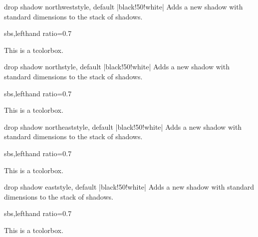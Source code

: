 \begin{docTcbKey}{drop shadow northwest}{}{style, default |black!50!white|}
  Adds a new shadow with standard dimensions to the stack of shadows.
\begin{dispExample*}{sbs,lefthand ratio=0.7}
\begin{tcolorbox}[drop shadow northwest,
  enhanced,colback=red!5!white,colframe=red!75!black]
  This is a tcolorbox.
\end{tcolorbox}
\end{dispExample*}
\end{docTcbKey}%

\begin{docTcbKey}{drop shadow north}{}{style, default |black!50!white|}
  Adds a new shadow with standard dimensions to the stack of shadows.
\begin{dispExample*}{sbs,lefthand ratio=0.7}
\begin{tcolorbox}[drop shadow north,
  enhanced,colback=red!5!white,colframe=red!75!black]
  This is a tcolorbox.
\end{tcolorbox}
\end{dispExample*}
\end{docTcbKey}%

\clearpage
\begin{docTcbKey}{drop shadow northeast}{}{style, default |black!50!white|}
  Adds a new shadow with standard dimensions to the stack of shadows.
\begin{dispExample*}{sbs,lefthand ratio=0.7}
\begin{tcolorbox}[drop shadow northeast,
  enhanced,colback=red!5!white,colframe=red!75!black]
  This is a tcolorbox.
\end{tcolorbox}
\end{dispExample*}
\end{docTcbKey}%

\begin{docTcbKey}{drop shadow east}{}{style, default |black!50!white|}
  Adds a new shadow with standard dimensions to the stack of shadows.
\begin{dispExample*}{sbs,lefthand ratio=0.7}
\begin{tcolorbox}[drop shadow east,
  enhanced,colback=red!5!white,colframe=red!75!black]
  This is a tcolorbox.
\end{tcolorbox}
\end{dispExample*}
\end{docTcbKey}%


